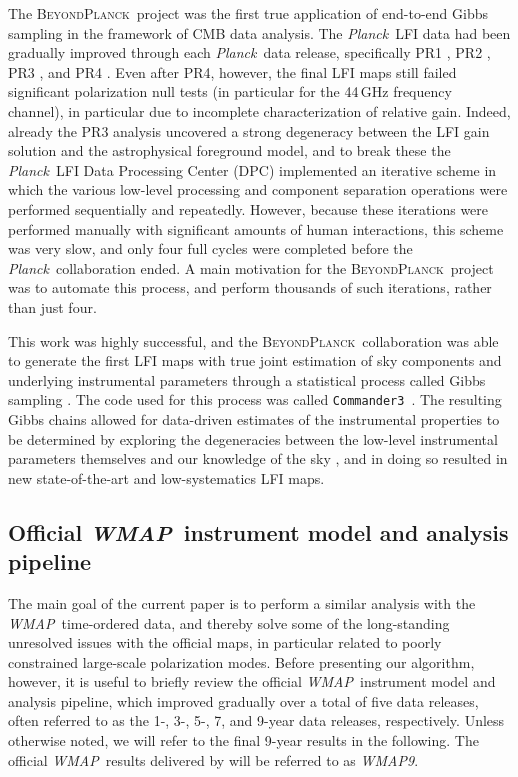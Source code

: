 \documentclass[twocolumn]{../../common/aa}
\def\WMAP{\emph{WMAP}}
\def\WMAPnine{\emph{WMAP9}}
\def\Planck{\emph{Planck}}
\def\commanderthree{\texttt{Commander3}}
\newcommand{\BP}{\textsc{BeyondPlanck}}
\newcommand{\bp}{\textsc{BeyondPlanck}}
\begin{document}
The \bp\ project \citep{bp01} was the first true application of end-to-end Gibbs sampling in the framework of CMB data analysis. The \Planck\ LFI data had been gradually improved through each \Planck\ data release, specifically  PR1 \citep{planck2013-p02}, PR2 \citep{planck2014-a03}, PR3 \citep{planck2016-l02}, and PR4 \citep{planck2020-LVII}. Even after PR4, however, the final LFI maps still failed significant polarization null tests (in particular for the 44\,GHz frequency channel), in particular due to incomplete characterization of relative gain. Indeed, already the PR3 analysis  uncovered a strong degeneracy between the LFI gain solution and the astrophysical foreground model, and to break these the \Planck\ LFI Data Processing Center (DPC) implemented an iterative scheme in which the various low-level processing and component separation operations were performed sequentially and repeatedly. However, because these iterations were performed manually with significant amounts of human interactions, this scheme was very slow, and only four full cycles were completed before the \Planck\ collaboration ended. A main motivation for the \BP\ project was to automate this process, and perform thousands of such iterations, rather than just four. 

This work was highly successful, and the \bp\ collaboration was able to generate the first LFI maps with true joint estimation of sky components and underlying instrumental parameters through a statistical process called Gibbs sampling \citep{bp01,bp03,bp10}. The code used for this process was called \commanderthree\ \citep{bp03}. The resulting Gibbs chains allowed for data-driven estimates of the instrumental properties to be determined by exploring the degeneracies between the low-level instrumental parameters themselves and our knowledge of the sky \citep{bp13,bp14}, and in doing so resulted in new state-of-the-art and low-systematics LFI maps.

\subsection{Official \WMAP\ instrument model and analysis pipeline}
\label{sec:wmap_instmodel}

The main goal of the current paper is to perform a similar analysis with the \WMAP\ time-ordered data, and thereby solve some of the long-standing unresolved issues with the official maps, in particular related to poorly constrained large-scale polarization modes. Before presenting our algorithm, however, it is useful to briefly review the official \WMAP\ instrument model and analysis pipeline, which improved gradually over a total of five data releases, often referred to as the 1-, 3-, 5-, 7, and 9-year data releases, respectively. Unless otherwise noted, we will refer to the final 9-year results in the following. The official \WMAP\ results delivered by \citet{bennett2012} will be referred to as \WMAPnine.
\end{document}

